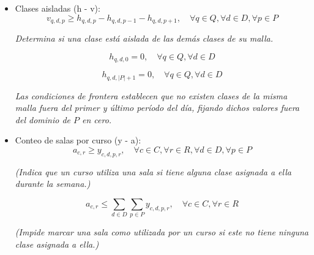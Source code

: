 \documentclass[letter, 10pt]{article}
\begin{document}
\begin{itemize}
    \[
    h_{q,d,p} \leq \sum_{c \in q} x_{c,d,p}, \quad \forall q \in Q, \forall d \in D, \forall p \in P
    \]
    \begin{center}
    \begin{minipage}{0.7\textwidth}
    \centering
    \textit{(Impide marcar un per\'iodo como utilizado por una malla si ninguno de sus cursos tiene clase en \'el.)}
    \end{minipage}
    \end{center}

    \item Clases aisladas (h - v):
        \[
        v_{q,d,p} \geq h_{q,d,p} - h_{q,d,p-1} - h_{q,d,p+1},
        \quad \forall q \in Q, \forall d \in D, \forall p \in P
        \]
        \begin{center}
        \begin{minipage}{0.7\textwidth}
        \centering
        \textit{Determina si una clase est\'a aislada de las dem\'as clases de su malla.}
        \end{minipage}
        \end{center}
        \[
        h_{q,d,0} = 0,
        \quad \forall q \in Q, \forall d \in D
        \]

        \[
        h_{q,d,|P|+1} = 0,
        \quad \forall q \in Q, \forall d \in D
        \]

        \begin{center}
        \begin{minipage}{0.7\textwidth}
        \centering
        \textit{Las condiciones de frontera establecen que no existen clases de la misma malla fuera del primer y \'ultimo per\'iodo del d\'ia, fijando dichos valores
        fuera del dominio de $P$ en cero.}
        \end{minipage}
        \end{center}

    \item Conteo de salas por curso (y - a):
    \[
    a_{c,r} \geq y_{c,d,p,r}, \quad \forall c \in C, \forall r \in R, \forall d \in D, \forall p \in P
    \]
    \begin{center}
    \begin{minipage}{0.7\textwidth}
    \centering
    \textit{(Indica que un curso utiliza una sala si tiene alguna clase asignada a ella durante la semana.)}
    \end{minipage}
    \end{center}

    \[
    a_{c,r} \leq \sum_{d \in D} \sum_{p \in P} y_{c,d,p,r}, \quad \forall c \in C, \forall r \in R
    \]
    \begin{center}
    \begin{minipage}{0.7\textwidth}
    \centering
    \textit{(Impide marcar una sala como utilizada por un curso si este no tiene ninguna clase asignada a ella.)}
    \end{minipage}
    \end{center}

\end{itemize}
\end{document}

